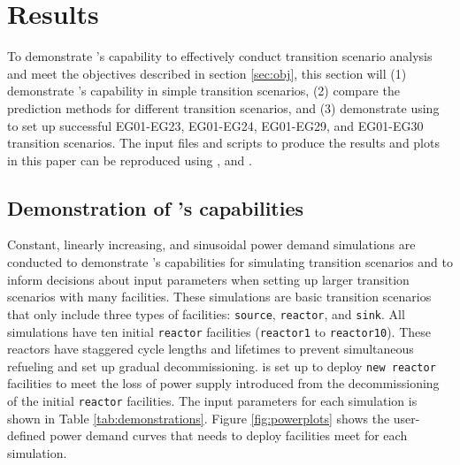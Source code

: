\section{Results}
To demonstrate \deploy's capability to effectively conduct transition
scenario analysis and meet the objectives described in section 
\ref{sec:obj}, this section will 
(1) demonstrate \deploy's capability in simple transition scenarios, 
(2) compare the prediction methods for different transition scenarios, and
(3) demonstrate using \deploy to set up successful EG01-EG23, EG01-EG24, 
EG01-EG29, and EG01-EG30 transition scenarios. 
The input files and scripts to produce the results and plots in this
paper can be reproduced using \cite{dnoauthor_d3ploy:_2018}, and 
\cite{chee_arfc/transition-scenarios_2018}. 

\subsection{Demonstration of \deploy's capabilities}
\label{sec:demo}
Constant, linearly increasing, and sinusoidal power demand simulations 
are conducted to demonstrate \deploy's capabilities for 
simulating transition scenarios and to inform decisions about 
input parameters when setting up larger transition scenarios 
with many facilities.  
These simulations are basic transition scenarios that only include 
three types of facilities: \texttt{source}, \texttt{reactor}, and 
\texttt{sink}. 
All simulations have ten initial \texttt{reactor} facilities 
(\texttt{reactor1} to \texttt{reactor10}). 
These reactors have staggered cycle lengths and lifetimes to prevent 
simultaneous refueling and set up gradual decommissioning. 
\deploy is set up to deploy \texttt{new reactor} facilities
to meet the loss of power supply introduced from the decommissioning 
of the initial \texttt{reactor} facilities. 
The \deploy input parameters for each simulation is shown in Table 
\ref{tab:demonstrations}. 
Figure \ref{fig:powerplots} shows the user-defined power demand curves 
that \deploy needs to deploy facilities meet for each simulation.

